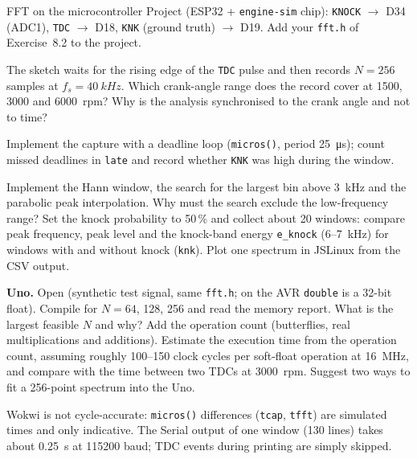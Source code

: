 \begin{exercise}{FFT on the microcontroller}{\Wokwi}
Project  (ESP32 + \texttt{engine-sim} chip):
\texttt{KNOCK} $\rightarrow$ D34 (ADC1), \texttt{TDC} $\rightarrow$ D18,
\texttt{KNK} (ground truth) $\rightarrow$ D19. Add your \texttt{fft.h} of
Exercise~8.2 to the project.
\begin{tasks}
  \item The sketch waits for the rising edge of the \texttt{TDC} pulse and then
    records $N=256$ samples at $f_s=\SI{40}{kHz}$. Which crank-angle range does
    the record cover at 1500, 3000 and \SI{6000}{rpm}? Why is the analysis
    synchronised to the crank angle and not to time?
  \item Implement the capture with a deadline loop (\texttt{micros()}, period
    \SI{25}{\micro s}); count missed deadlines in \texttt{late} and record
    whether \texttt{KNK} was high during the window.
  \item Implement the Hann window, the search for the largest bin above
    \SI{3}{kHz} and the parabolic peak interpolation. Why must the search
    exclude the low-frequency range? Set the knock probability to 50\,\% and
    collect about 20 windows: compare peak frequency, peak level and the
    knock-band energy \texttt{e\_knock} (6--\SI{7}{kHz}) for windows with and
    without knock (\texttt{knk}). Plot one spectrum in JSLinux from the CSV
    output.
  \item \textbf{Uno.} Open  (synthetic test
    signal, same \texttt{fft.h}; on the AVR \texttt{double} is a 32-bit float).
    Compile for $N=64$, 128, 256 and read the memory report. What is the
    largest feasible $N$ and why? Add the operation count (butterflies, real
    multiplications and additions). Estimate the execution time from the
    operation count, assuming roughly 100--150 clock cycles per soft-float
    operation at \SI{16}{MHz}, and compare with the time between two TDCs at
    \SI{3000}{rpm}. Suggest two ways to fit a 256-point spectrum into the Uno.
\end{tasks}
\begin{hint}
\hinttext Wokwi is not cycle-accurate: \texttt{micros()} differences
(\texttt{tcap}, \texttt{tfft}) are simulated times and only indicative. The
Serial output of one window (130 lines) takes about \SI{0.25}{s} at 115200 baud;
TDC events during printing are simply skipped.
\end{hint}
\end{exercise}

